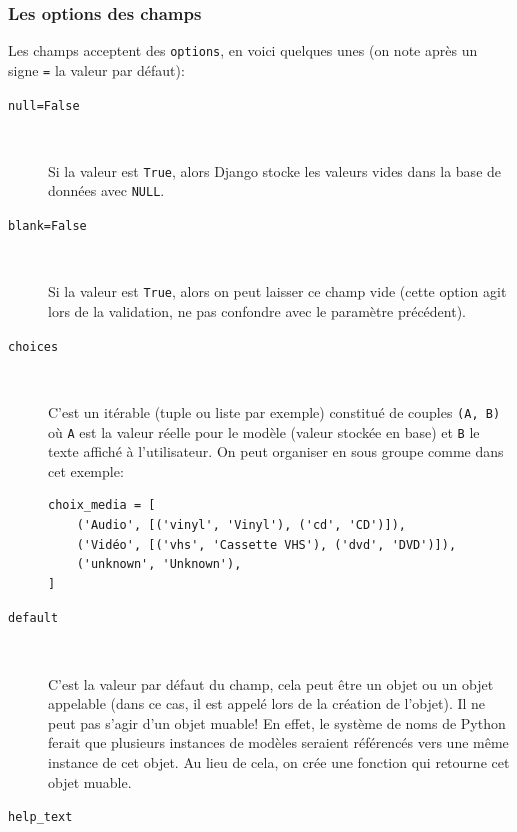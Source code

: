 \documentclass[a4paper, 10pt]{article}
\begin{document}
\subsubsection{Les options des champs}
Les champs acceptent des \texttt{options}, en voici quelques unes (on note après un signe \texttt{=} la valeur par défaut):
\begin{description}
    \item[\texttt{null=False}]~

          Si la valeur est \texttt{True}, alors Django stocke les valeurs vides dans la base de données avec \texttt{NULL}.

    \item[\texttt{blank=False}]~

          Si la valeur est \texttt{True}, alors on peut laisser ce champ vide (cette option agit lors de la validation, ne pas confondre avec le paramètre précédent).

    \item[\texttt{choices}]~

          C'est un itérable (tuple ou liste par exemple) constitué de couples \texttt{(A, B)} où \texttt{A} est la valeur réelle pour le modèle (valeur stockée en base) et \texttt{B} le texte affiché à l'utilisateur. On peut organiser en sous groupe comme dans cet exemple:

          \begin{verbatim}
choix_media = [
    ('Audio', [('vinyl', 'Vinyl'), ('cd', 'CD')]),
    ('Vidéo', [('vhs', 'Cassette VHS'), ('dvd', 'DVD')]),
    ('unknown', 'Unknown'),
]
    \end{verbatim}

    \item[\texttt{default}]~

          C'est la valeur par défaut du champ, cela peut être un objet ou un objet appelable (dans ce cas, il est appelé lors de la création de l'objet). Il ne peut pas s'agir d'un objet muable! En effet, le système de noms de Python ferait que plusieurs instances de modèles seraient référencés vers une même instance de cet objet. Au lieu de cela, on crée une fonction qui retourne cet objet muable.

    \item[\texttt{help_text}]~


\end{description}
\end{document}
